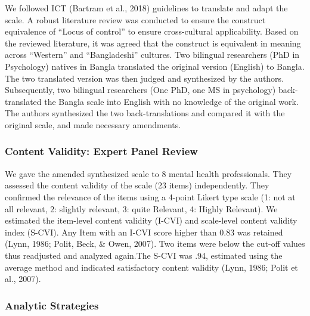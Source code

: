 \documentclass[
  english,
  man]{apa6}
\begin{document}
We followed ICT (Bartram et al., 2018) guidelines to translate and adapt the scale. A robust literature review was conducted to ensure the construct equivalence of ``Locus of control'' to ensure cross-cultural applicability. Based on the reviewed literature, it was agreed that the construct is equivalent in meaning across ``Western'' and ``Bangladeshi'' cultures. Two bilingual researchers (PhD in Psychology) natives in Bangla translated the original version (English) to Bangla. The two translated version was then judged and synthesized by the authors. Subsequently, two bilingual researchers (One PhD, one MS in psychology) back-translated the Bangla scale into English with no knowledge of the original work. The authors synthesized the two back-translations and compared it with the original scale, and made necessary amendments.

\hypertarget{content-validity-expert-panel-review}{%
\subsubsection{Content Validity: Expert Panel Review}\label{content-validity-expert-panel-review}}

We gave the amended synthesized scale to 8 mental health professionals. They assessed the content validity of the scale (23 items) independently. They confirmed the relevance of the items using a 4-point Likert type scale (1: not at all relevant, 2: slightly relevant, 3: quite Relevant, 4: Highly Relevant). We estimated the item-level content validity (I-CVI) and scale-level content validity index (S-CVI). Any Item with an I-CVI score higher than 0.83 was retained (Lynn, 1986; Polit, Beck, \& Owen, 2007). Two items were below the cut-off values thus readjusted and analyzed again.The S-CVI was .94, estimated using the average method and indicated satisfactory content validity (Lynn, 1986; Polit et al., 2007).

\hypertarget{analytic-strategies}{%
\subsubsection{Analytic Strategies}\label{analytic-strategies}}
\end{document}
